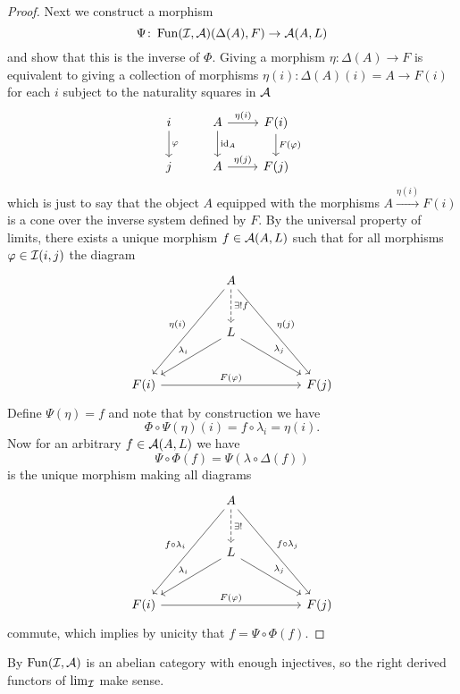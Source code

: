 \documentclass[reqno, 12pt]{amsart}
\begin{document}
\begin{proof}
  Next we construct a morphism
  $$\Psi \colon \operatorname{Fun}(\mathcal{I},\mathcal{A})(\Delta(A), F) \to \mathcal{A}(A, L)$$
  and show that this is the inverse of $\Phi$.
  Giving a morphism $\eta \colon \Delta(A) \to F$ is equivalent to giving a collection of morphisms $\eta(i) \colon \Delta(A)(i) = A \to F(i)$ for each $i$ subject to the naturality squares in $\mathcal{A}$
  $$\begin{tikzcd}
    i \arrow{d}{\varphi} & A \arrow{d}{\id_A}\arrow{r}{\eta(i)} & F(i)\arrow{d}{F(\varphi)}\\
    j & A \arrow{r}{\eta(j)} & F(j)
  \end{tikzcd}$$
  which is just to say that the object $A$ equipped with the morphisms $A \overset{\eta(i)}\to F(i)$ is a cone over the inverse system defined by $F$.
  By the universal property of limits, there exists a unique morphism $f \in \mathcal{A}(A,L)$ such that for all morphisms $\varphi \in \mathcal{I}(i,j)$ the diagram
  $$\begin{tikzcd}[row sep=large,column sep=huge]
    & A\arrow[swap]{ldd}{\eta(i)}\arrow{rdd}{\eta(j)}\arrow[dashed]{d}{\exists !f}\\
    & L\arrow[swap]{ld}{\lambda_i}\arrow{rd}{\lambda_j}\\
    F(i) \arrow{rr}{F(\varphi)} & & F(j)
  \end{tikzcd}$$
  Define $\Psi(\eta) = f$ and note that by construction we have 
  $$\Phi \circ \Psi(\eta)(i) = f \circ \lambda_i = \eta(i).$$
  Now for an arbitrary $f \in \mathcal{A}(A,L)$ we have
  $$\Psi \circ \Phi(f) = \Psi(\lambda \circ \Delta(f))$$
  is the unique morphism making all diagrams
  $$\begin{tikzcd}[row sep=large,column sep=huge]
    & A\arrow[swap]{ldd}{f \circ \lambda_i}\arrow{rdd}{f \circ \lambda_j}\arrow[dashed]{d}{\exists !}\\
    & L\arrow[swap]{ld}{\lambda_i}\arrow{rd}{\lambda_j}\\
    F(i) \arrow{rr}{F(\varphi)} & & F(j)
  \end{tikzcd}$$
  commute, which implies by unicity that $f = \Psi \circ \Phi(f)$.
\end{proof}

By \cite[Example 2.3.13]{Weibel95} $\operatorname{Fun}(\mathcal{I},\mathcal{A})$ is an abelian category with enough injectives, so the right derived functors of $\lim_{\mathcal{I}}$ make sense.



\end{document}

